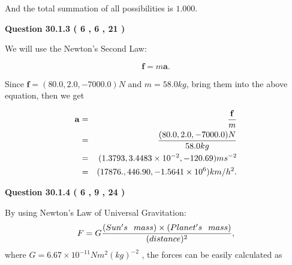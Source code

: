 \documentclass[12pt]{article}
\begin{document}
\noindent
 And the total summation of all possibilities is $  %
1.000 $.
 
 
 
  
\vspace{0.2in}
  
{\textbf{\Large{Question
30.1.3 
 (           6 ,           6 ,          21 )
}}}
  
  
 
 
\noindent{}

We will use the Newton's Second Law:
 
\[
\mathbf{f}=m\mathbf{a}.
\]
 
Since $\mathbf{f}=( %
80.0,  %
2.0,  %
-7000.0 )N$
and $m= %
58.0 kg$, bring them into the above equation, then we get
 
\begin{eqnarray*}
\mathbf{a}&=&\frac{\mathbf{f}}m  \\
&=&\frac{(
80.0 ,
2.0 ,
-7000.0 )N
}{ %
58.0 kg}  \\
&=&(
1.3793 ,
3.4483 \times 10^{-2},
-120.69
)ms^{-2} \\
&=&(
17876. ,
446.90 ,
-1.5641 \times 10^{6}
)km/h^2.
\end{eqnarray*}
 
 
 
  
\vspace{0.2in}
  
{\textbf{\Large{Question
30.1.4 
 (           6 ,           9 ,          24 )
}}}
  
  
 
 
\noindent{}

By using Newton's Law of Universal Gravitation:
\[
F=G \frac{(Sun's \hspace{0.1in} mass) \times (Planet's \hspace{0.1in} mass)} { (distance)^2},
\]
where
$ G= %
6.67 \times 10^{-11} N m^{2}(kg)^{-2}$ , the forces can be easily calculated as
 
\vspace{0.2in}
 
\end{document}
